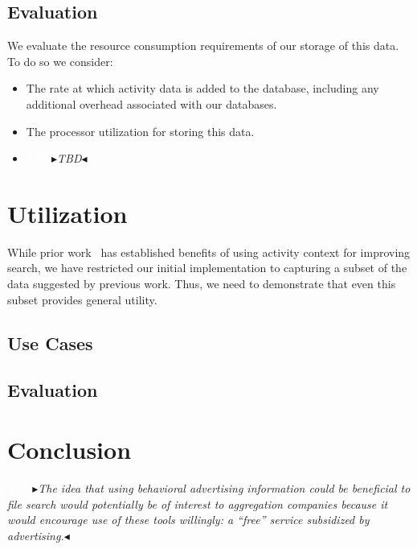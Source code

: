 \documentclass[sigconf,anonymous,review]{acmart}
\newcommand{\nbc}[3]{
 {\colorbox{#3}{\bfseries\sffamily\scriptsize\textcolor{white}{#1}}}
 {\textcolor{#3}{\sf\small$\blacktriangleright$\textit{#2}$\blacktriangleleft$}}}
\newcommand\tm[1]{\nbc{TM}{#1}{tmcolor}}
\begin{document}
\subsection{Evaluation}

We evaluate the resource consumption requirements of our storage of this data.
To do so we consider:

\begin{itemize}
    \item The rate at which activity data is added to the database, including
    any additional overhead associated with our databases.
    \item The processor utilization for storing this data.
    \item \tm{TBD}
\end{itemize}


\section{Utilization}
\label{sec:utilization}

While prior work~\cite{vianna2019searching} has established benefits of using
activity context for improving search, we have restricted our initial
implementation to capturing a subset of the data suggested by previous work.
Thus, we need to demonstrate that even this subset provides general utility.

\subsection{Use Cases}

\subsection{Evaluation}

\section{Conclusion}

\tm{The idea that using behavioral advertising information could be beneficial
to file search would potentially be of interest to aggregation companies
because it would encourage use of these tools willingly: a ``free'' service
subsidized by advertising.}


\nocite{*}
\clearpage



\end{document}
